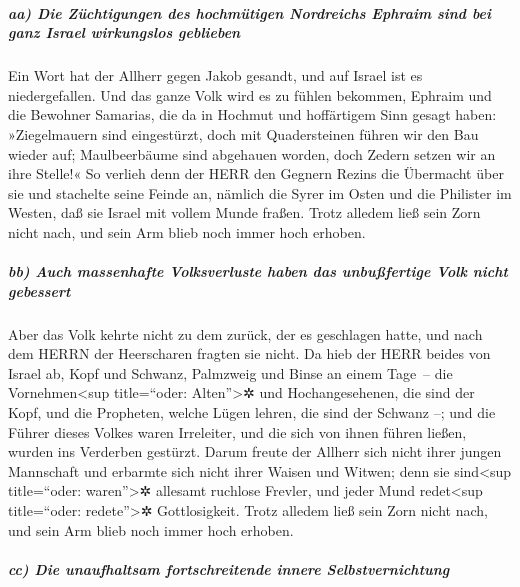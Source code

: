 \hypertarget{aa-die-zuxfcchtigungen-des-hochmuxfctigen-nordreichs-ephraim-sind-bei-ganz-israel-wirkungslos-geblieben}{%
\subparagraph{aa) Die Züchtigungen des hochmütigen Nordreichs Ephraim
sind bei ganz Israel wirkungslos
geblieben}\label{aa-die-zuxfcchtigungen-des-hochmuxfctigen-nordreichs-ephraim-sind-bei-ganz-israel-wirkungslos-geblieben}}

Ein Wort hat der Allherr gegen Jakob gesandt, und auf
Israel ist es niedergefallen. Und das ganze Volk wird es
zu fühlen bekommen, Ephraim und die Bewohner Samarias, die da in Hochmut
und hoffärtigem Sinn gesagt haben: »Ziegelmauern sind
eingestürzt, doch mit Quadersteinen führen wir den Bau wieder auf;
Maulbeerbäume sind abgehauen worden, doch Zedern setzen wir an ihre
Stelle!« So verlieh denn der HERR den Gegnern Rezins die
Übermacht über sie und stachelte seine Feinde an, nämlich
die Syrer im Osten und die Philister im Westen, daß sie Israel mit
vollem Munde fraßen. Trotz alledem ließ sein Zorn nicht nach, und sein
Arm blieb noch immer hoch erhoben.

\hypertarget{bb-auch-massenhafte-volksverluste-haben-das-unbuuxdffertige-volk-nicht-gebessert}{%
\subparagraph{bb) Auch massenhafte Volksverluste haben das unbußfertige
Volk nicht
gebessert}\label{bb-auch-massenhafte-volksverluste-haben-das-unbuuxdffertige-volk-nicht-gebessert}}

Aber das Volk kehrte nicht zu dem zurück, der es
geschlagen hatte, und nach dem HERRN der Heerscharen fragten sie nicht.
Da hieb der HERR beides von Israel ab, Kopf und Schwanz,
Palmzweig und Binse an einem Tage~-- die
Vornehmen\textless sup title=``oder: Alten''\textgreater✲ und
Hochangesehenen, die sind der Kopf, und die Propheten, welche Lügen
lehren, die sind der Schwanz --; und die Führer dieses
Volkes waren Irreleiter, und die sich von ihnen führen ließen, wurden
ins Verderben gestürzt. Darum freute der Allherr sich
nicht ihrer jungen Mannschaft und erbarmte sich nicht ihrer Waisen und
Witwen; denn sie sind\textless sup title=``oder: waren''\textgreater✲
allesamt ruchlose Frevler, und jeder Mund redet\textless sup
title=``oder: redete''\textgreater✲ Gottlosigkeit. Trotz alledem ließ
sein Zorn nicht nach, und sein Arm blieb noch immer hoch erhoben.

\hypertarget{cc-die-unaufhaltsam-fortschreitende-innere-selbstvernichtung}{%
\subparagraph{cc) Die unaufhaltsam fortschreitende innere
Selbstvernichtung}\label{cc-die-unaufhaltsam-fortschreitende-innere-selbstvernichtung}}


